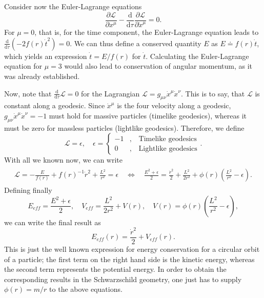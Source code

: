 \documentclass[a4paper,11pt]{article}
\numberwithin{equation}{section}
\begin{document}
{Consider now the Euler-Lagrange equations \begin{equation}
\frac{\partial \mathcal{L}}{\partial x^\mu} -\frac{\mathrm{d}}{\mathrm{d}\tau}\frac{\partial \mathcal{L}}{\partial \dot{x}^\mu} = 0.
\end{equation} For $\mu = 0$, that is, for the time component, the Euler-Lagrange equation leads to $\frac{\mathrm{d}}{\mathrm{d}\tau}(-2f(r)\dot{t}^2) = 0$. We can thus define a conserved quantity $E$ as $E \doteq f(r)\dot{t}$, which yields an expression $\dot{t} = E/f(r)$ for $\dot{t}$. Calculating the Euler-Lagrange equation for $\mu = 3$ would also lead to conservation of angular momentum, as it was already established.

Now, note that $\frac{\mathrm{d}}{\mathrm{d}\tau}\mathcal{L} = 0$ for the Lagrangian $\mathcal{L} = g_{\mu\nu}\dot{x}^\mu\dot{x}^\nu$. This is to say, that $\mathcal{L}$ is constant along a geodesic. Since $\dot{x}^\mu$ is the four velocity along a geodesic, $g_{\mu\nu}\dot{x}^\mu\dot{x}^\nu = -1$ must hold for massive particles (timelike geodesics), whereas it must be zero for massless particles (lightlike geodesics). Therefore, we define \begin{equation}
\mathcal{L} = \epsilon, \quad \epsilon = \begin{cases}
-1&,\quad \text{Timelike geodesics} \\
0&, \quad \text{Lightlike geodesics}
\end{cases}.
\end{equation} With all we known now, we can write \begin{align}
\begin{aligned}
\mathcal{L} = -\frac{E}{f(r)} + f(r)^{-1}\dot{r}^2 + \frac{L^2}{r^2} = \epsilon \quad \Leftrightarrow \quad \frac{E^2 + \epsilon}{2} = \frac{\dot{r}^2}{2} + \frac{L^2}{2r^2} + \phi(r)\left(\frac{L^2}{r^2}-\epsilon\right).
\end{aligned}
\end{align} Defining finally \begin{equation}
E_{eff} = \frac{E^2 + \epsilon}{2}, \quad V_{eff} = \frac{L^2}{2r^2}+ V(r), \quad V(r) = \phi(r)\left(\frac{L^2}{r^2}-\epsilon\right),
\end{equation} we can write the final result as \begin{equation}
E_{eff}(r) = \frac{\dot{r}^2}{2} + V_{eff}(r).
\end{equation} This is just the well known expression for energy conservation for a circular orbit of a particle; the first term on the right hand side is the kinetic energy, whereas the second term represents the potential energy. In order to obtain the corresponding results in the Schwarzschild geometry, one just has to supply $\phi(r) = m/r$ to the above equations.

}
\end{document}
